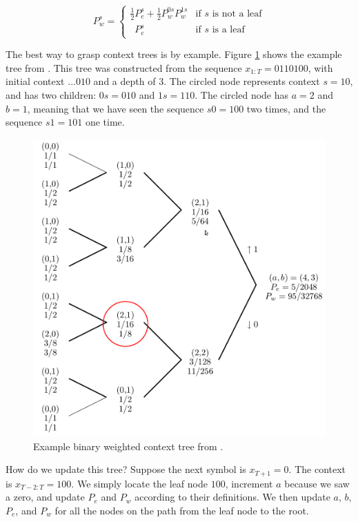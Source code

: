 \documentclass[11pt]{scrartcl}
\begin{document}
\[
P_w^s =
\left\{
\begin{array}{ll}
\frac{1}{2} P_e^s + \frac{1}{2} P_w^{0s} P_w^{1s}
    & \mbox{if $s$ is not a leaf} \\
\phantom{\frac{1}{2}} P_e^s
    & \mbox{if $s$ is a leaf}
\end{array}
\right.
\]

The best way to grasp context trees is by example. Figure \ref{fig:bin-tree}
shows the example tree from \textcite{eidma}. This tree was constructed from
the sequence $x_{1:T} = 0110100$, with initial context $...010$ and a depth of
3.  The circled node represents context $s = 10$, and has two children: $0s =
010$ and $1s = 110$. The circled node has $a = 2$ and $b = 1$, meaning that we
have seen the sequence $s0 = 100$ two times, and the sequence $s1 = 101$ one
time.

\begin{figure}[h!]
    \centering
    \includegraphics[width=12cm]{eidma-fig-3-2-ed.png}
    \caption{Example binary weighted context tree from \textcite{eidma}.}
    \label{fig:bin-tree}
\end{figure}

How do we update this tree? Suppose the next symbol is $x_{T+1} = 0$. The
context is $x_{T-2:T} = 100$. We simply locate the leaf node $100$, increment
$a$ because we saw a zero, and update $P_e$ and $P_w$ according to their
definitions. We then update $a$, $b$, $P_e$, and $P_w$ for all the nodes on the
path from the leaf node to the root.
\end{document}
